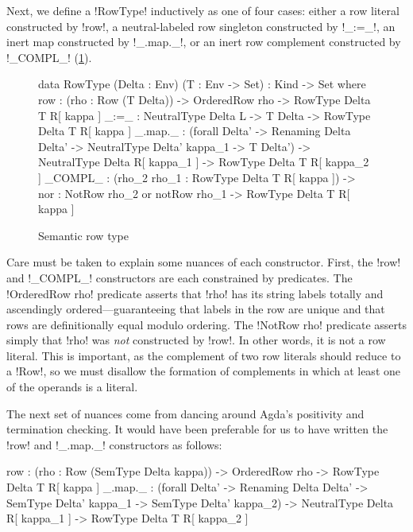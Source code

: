 \documentclass[sigplan,10pt,review]{acmart}\settopmatter{printfolios=true,printccs=false,printacmref=false}
\begin{document}
\Ni Next, we define a !RowType! inductively as one of four cases: either a row literal constructed by !row!, a neutral-labeled row singleton constructed by !_:=_!, an inert map constructed by !_.map._!, or an inert row complement constructed by !_COMPL_! (\cref{fig:semantic-rows}).
\begin{figure}
\begin{agda}
data RowType (Delta : Env) 
             (T : Env -> Set) : Kind -> Set where 
  row      : (rho : Row (T Delta)) -> 
              OrderedRow rho -> 
              RowType Delta T R[ kappa ]
  _:=_     : NeutralType Delta L -> 
             T Delta -> 
             RowType Delta T R[ kappa ]
  _.map._  : (forall {Delta'} -> 
                Renaming Delta Delta' -> 
                NeutralType Delta' kappa_1 -> 
                T Delta') -> 
             NeutralType Delta R[ kappa_1 ] -> 
             RowType Delta T R[ kappa_2 ]
  _COMPL_  : (rho_2  rho_1 : RowType Delta T R[ kappa ]) -> 
             {nor : NotRow rho_2  or  notRow rho_1} -> 
             RowType Delta T R[ kappa ]
\end{agda}
\caption{Semantic row type}
\label{fig:semantic-rows}
\end{figure}

Care must be taken to explain some nuances of each constructor. First, the !row! and !_COMPL_! constructors are each constrained by predicates. The !OrderedRow rho! predicate asserts that !rho! has its string labels totally and ascendingly ordered---guaranteeing that labels in the row are unique and that rows are definitionally equal modulo ordering. The !NotRow rho! predicate asserts simply that !rho! was \emph{not} constructed by !row!. In other words, it is not a row literal. This is important, as the complement of two row literals should reduce to a !Row!, so we must disallow the formation of complements in which at least one of the operands is a literal. 

The next set of nuances come from dancing around Agda's positivity and termination checking. It would have been preferable for us to have written the !row! and !_.map._! constructors as follows: 
\begin{agda}
  row      : (rho : Row (SemType Delta kappa)) -> 
             OrderedRow rho -> 
             RowType Delta T R[ kappa ]
  _.map._  : (forall {Delta'} -> 
                Renaming Delta Delta' -> 
                SemType Delta' kappa_1 -> 
                SemType Delta' kappa_2) -> 
             NeutralType Delta R[ kappa_1 ] -> 
             RowType Delta T R[ kappa_2 ]
\end{agda}
\end{document}
